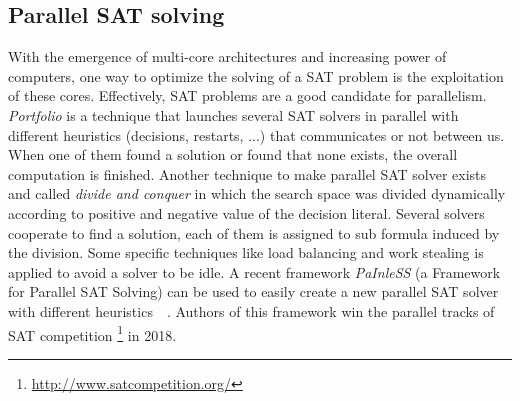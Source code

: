 \subsection{Parallel SAT solving}
With the emergence of multi-core architectures and increasing power of computers, one way to optimize the solving
of a SAT problem is the exploitation of these cores. Effectively, SAT problems are a good candidate for parallelism.
\emph{Portfolio} is a technique that launches several SAT solvers in parallel with different heuristics (decisions, restarts, ...) that communicates or not between us. When one of them found a solution or found that none exists, the overall computation is finished. Another technique to make parallel SAT solver exists and called \emph{divide and conquer} in which the search space was divided dynamically according to positive and negative value of the decision
literal. Several solvers cooperate to find a solution, each of them is assigned to sub formula induced by the division. Some specific techniques like load balancing and work stealing is applied to avoid a solver to be idle.
A recent framework \emph{PaInleSS} (a Framework for Parallel SAT Solving) can be used to easily create a new parallel 
SAT solver with different heuristics~\cite{le2017painless}~\cite{le2019modular}. Authors of this framework win the parallel tracks of SAT competition \footnote{\url{http://www.satcompetition.org/}} in 2018.



%
